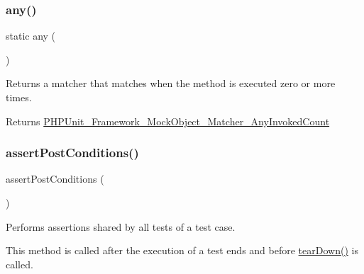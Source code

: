 \subsubsection{\texorpdfstring{any()}{any()}}
{\footnotesize\ttfamily static any (\begin{DoxyParamCaption}{ }\end{DoxyParamCaption})\hspace{0.3cm}{\ttfamily [static]}}

Returns a matcher that matches when the method is executed zero or more times.

\begin{DoxyReturn}{Returns}
\mbox{\hyperlink{class_p_h_p_unit___framework___mock_object___matcher___any_invoked_count}{P\+H\+P\+Unit\+\_\+\+Framework\+\_\+\+Mock\+Object\+\_\+\+Matcher\+\_\+\+Any\+Invoked\+Count}} 
\end{DoxyReturn}
\mbox{\label{class_p_h_p_unit___framework___test_case_abf54422376f10d9cbe49a06676e39e86}} 
\subsubsection{\texorpdfstring{assert\+Post\+Conditions()}{assertPostConditions()}}
{\footnotesize\ttfamily assert\+Post\+Conditions (\begin{DoxyParamCaption}{ }\end{DoxyParamCaption})\hspace{0.3cm}{\ttfamily [protected]}}

Performs assertions shared by all tests of a test case.

This method is called after the execution of a test ends and before \mbox{\hyperlink{class_p_h_p_unit___framework___test_case_a80fe3d17e658907fc75346a0ec9d6fc7}{tear\+Down()}} is called. \mbox{\label{class_p_h_p_unit___framework___test_case_ad6402f56c691a56954229b7e6a2294aa}} 
